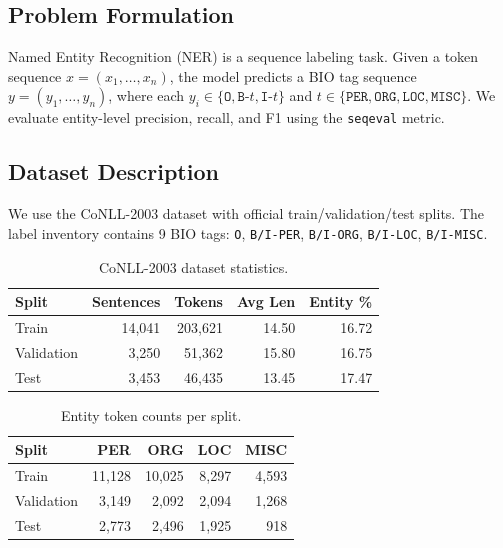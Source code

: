 
\subsection{Problem Formulation}
Named Entity Recognition (NER) is a sequence labeling task. Given a token sequence $x = (x_1, \dots, x_n)$, the model predicts a BIO tag sequence $y = (y_1, \dots, y_n)$, where each $y_i \in \{\texttt{O}, \texttt{B-}t, \texttt{I-}t\}$ and $t \in \{\texttt{PER}, \texttt{ORG}, \texttt{LOC}, \texttt{MISC}\}$. We evaluate entity-level precision, recall, and F1 using the \texttt{seqeval} metric.

\subsection{Dataset Description}
We use the CoNLL-2003 dataset \citep{TjongKimSang2003conll} with official train/validation/test splits. The label inventory contains 9 BIO tags: \texttt{O}, \texttt{B/I-PER}, \texttt{B/I-ORG}, \texttt{B/I-LOC}, \texttt{B/I-MISC}.

\begin{table}[H]
\centering
\caption{CoNLL-2003 dataset statistics.}
\begin{tabular}{lrrrr}
\toprule
\textbf{Split} & \textbf{Sentences} & \textbf{Tokens} & \textbf{Avg Len} & \textbf{Entity \%} \\
\midrule
Train & 14,041 & 203,621 & 14.50 & 16.72 \\
Validation & 3,250 & 51,362 & 15.80 & 16.75 \\
Test & 3,453 & 46,435 & 13.45 & 17.47 \\
\bottomrule
\end{tabular}
\end{table}

\begin{table}[H]
\centering
\caption{Entity token counts per split.}
\begin{tabular}{lrrrr}
\toprule
\textbf{Split} & \textbf{PER} & \textbf{ORG} & \textbf{LOC} & \textbf{MISC} \\
\midrule
Train & 11,128 & 10,025 & 8,297 & 4,593 \\
Validation & 3,149 & 2,092 & 2,094 & 1,268 \\
Test & 2,773 & 2,496 & 1,925 & 918 \\
\bottomrule
\end{tabular}
\end{table}

